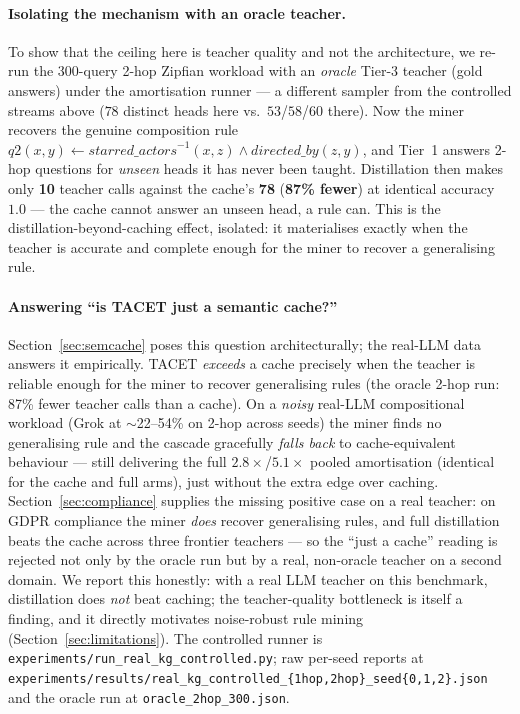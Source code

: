 \documentclass[11pt]{article}
\theoremstyle{plain}
\begin{document}
\paragraph{Isolating the mechanism with an oracle teacher.} To show that the
ceiling here is teacher quality and not the architecture, we re-run the
$300$-query 2-hop Zipfian workload with an \emph{oracle} Tier-3 teacher
(gold answers) under the amortisation runner --- a different sampler from
the controlled streams above ($78$ distinct heads here vs.\
$53$/$58$/$60$ there). Now the miner recovers the genuine composition rule
$q2(x,y)\!\leftarrow\!\mathit{starred\_actors}^{-1}(x,z)\wedge\mathit{directed\_by}(z,y)$,
and Tier~1 answers 2-hop questions for \emph{unseen} heads it has never been
taught. Distillation then makes only \textbf{10} teacher calls against the
cache's \textbf{78} (\textbf{87\% fewer}) at identical accuracy $1.0$ --- the
cache cannot answer an unseen head, a rule can. This is the
distillation-beyond-caching effect, isolated: it materialises exactly when the
teacher is accurate and complete enough for the miner to recover a generalising
rule.

\paragraph{Answering ``is TACET just a semantic cache?''} Section~\ref{sec:semcache}
poses this question architecturally; the real-LLM data answers it empirically.
TACET \emph{exceeds} a cache precisely when the teacher is reliable enough for
the miner to recover generalising rules (the oracle 2-hop run: 87\% fewer
teacher calls than a cache). On a \emph{noisy} real-LLM compositional workload
(Grok at $\sim$22--54\% on 2-hop across seeds) the miner finds no generalising
rule and the cascade gracefully \emph{falls back} to cache-equivalent behaviour
--- still delivering the full $2.8\times$/$5.1\times$ pooled amortisation
(identical for the cache and full arms), just without the extra edge over
caching. Section~\ref{sec:compliance} supplies the missing positive case on a real
teacher: on GDPR compliance the miner \emph{does} recover generalising rules,
and full distillation beats the cache across three frontier teachers --- so the
``just a cache'' reading is rejected not only by the oracle run but by a real,
non-oracle teacher on a second domain. We report this honestly: with a real LLM teacher on this
benchmark, distillation does \emph{not} beat caching; the teacher-quality
bottleneck is itself a finding, and it directly motivates noise-robust rule
mining (Section~\ref{sec:limitations}). The controlled runner is
\texttt{experiments/run\_real\_kg\_controlled.py}; raw per-seed reports at
\texttt{experiments/results/real\_kg\_controlled\_\{1hop,2hop\}\_seed\{0,1,2\}.json}
and the oracle run at \texttt{oracle\_2hop\_300.json}.
\end{document}
